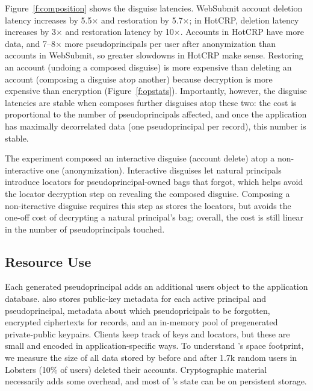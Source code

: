 Figure~\ref{f:composition} shows the disguise latencies.
%
WebSubmit account deletion latency increases by 5.5$\times$ and restoration by 5.7$\times$; in
HotCRP, deletion latency increases by 3$\times$ and restoration latency by 10$\times$.
%
Accounts in HotCRP have more data, and 7--8$\times$ more pseudoprincipals per user after
anonymization than accounts in WebSubmit, so greater slowdowns in HotCRP make sense.
%
Restoring an account (\ie undoing a composed disguise) is more expensive than deleting an
account (\ie composing a disguise atop another) because decryption is more expensive than
encryption (Figure~\ref{f:opstats}).
%
Importantly, however, the disguise latencies are stable when \sys composes further
disguises atop these two: the cost is proportional to the number of pseudoprincipals
affected, and once the application has maximally decorrelated data (\ie one pseudoprincipal
per record), this number is stable.
%

%
The experiment composed an interactive disguise (account delete) atop a
non-interactive one (anonymization).
%
Interactive disguises let natural principals introduce locators for
pseudoprincipal-owned bags that \sys forgot, which helps avoid the locator
decryption step on revealing the composed disguise.
%
Composing a non-iteractive disguise requires this step as \sys stores the
locators, but avoids the one-off cost of decrypting a natural
principal's bag; overall, the cost is still linear in the number of
pseudoprincipals touched.
%

\subsection{Resource Use}
\label{s:eval-res}

%
Each generated pseudoprincipal adds an additional users object to the application
database.
%
\sys also stores public-key metadata for each active principal and
pseudoprincipal, metadata about which pseudopricipals to be forgotten,
encrypted ciphertexts for records, and an in-memory pool of pregenerated
private-public keypairs.
%
Clients keep track of keys and locators, but these are small and encoded
in application-specific ways.
%
To understand \sys's space footprint, we measure the size of all data stored
by \sys before and after 1.7k random users in Lobsters (10\% of users)
deleted their accounts.
%
Cryptographic material necessarily adds some overhead, and most of \sys's
state can be on persistent storage.
%

